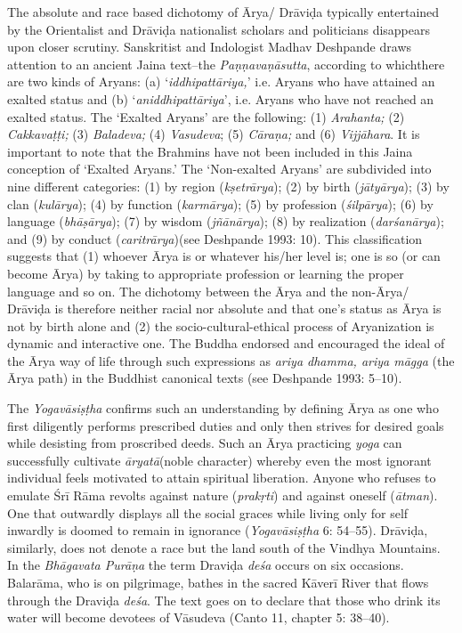 The absolute and race based dichotomy of Ārya/ Drāviḍa typically entertained by the Orientalist and Drāviḍa nationalist scholars and politicians disappears upon closer scrutiny. Sanskritist and Indologist Madhav Deshpande draws attention to an ancient Jaina text--the \textit{Paṇṇavaṇāsutta}, according to whichthere are two kinds of Aryans: (a) ‘\textit{iddhipattāriya,}’ i.e. Aryans who have attained an exalted status and (b) ‘\textit{aniddhipattāriya}’, i.e. Aryans who have not reached an exalted status. The ‘Exalted Aryans’ are the following: (1) \textit{Arahanta;} (2) \textit{Cakkavaṭṭi;} (3) \textit{Baladeva;} (4) \textit{Vasudeva}; (5) \textit{Cāraṇa;} and (6) \textit{Vijjāhara}. It is important to note that the Brahmins have not been included in this Jaina conception of ‘Exalted Aryans.’ The ‘Non-exalted Aryans’ are subdivided into nine different categories: (1) by region (\textit{kṣetrārya}); (2) by birth (\textit{jātyārya}); (3) by clan (\textit{kulārya}); (4) by function (\textit{karmārya}); (5) by profession (\textit{śilpārya}); (6) by language (\textit{bhāṣārya}); (7) by wisdom (\textit{jñānārya}); (8) by realization (\textit{darśanārya}); and (9) by conduct (\textit{caritrārya})(see Deshpande 1993: 10). This classification suggests that (1) whoever Ārya is or whatever his/her level is; one is so (or can become Ārya) by taking to appropriate profession or learning the proper language and so on. The dichotomy between the Ārya and the non-Ārya/ Drāviḍa is therefore neither racial nor absolute and that one’s status as Ārya is not by birth alone and (2) the socio-cultural-ethical process of Aryanization is dynamic and interactive one. The Buddha endorsed and encouraged the ideal of the Ārya way of life through such expressions as \textit{ariya dhamma, ariya māgga} (the Ārya path) in the Buddhist canonical texts (see Deshpande 1993: 5–10).

The \textit{Yogavāsiṣṭha} confirms such an understanding by defining Ārya as one who first diligently performs prescribed duties and only then strives for desired goals while desisting from proscribed deeds. Such an Ārya practicing \textit{yoga} can successfully cultivate \textit{āryatā}(noble character) whereby even the most ignorant individual feels motivated to attain spiritual liberation. Anyone who refuses to emulate Śrī Rāma revolts against nature (\textit{prakṛti}) and against oneself (\textit{ātman}). One that outwardly displays all the social graces while living only for self inwardly is doomed to remain in ignorance (\textit{Yogavāsiṣṭha} 6: 54–55). Drāviḍa, similarly, does not denote a race but the land south of the Vindhya Mountains. In the \textit{Bhāgavata Purāṇa} the term Draviḍa \textit{deśa} occurs on six occasions. Balarāma, who is on pilgrimage, bathes in the sacred Kāverī River that flows through the Draviḍa \textit{deśa}. The text goes on to declare that those who drink its water will become devotees of Vāsudeva (Canto 11, chapter 5: 38–40).


